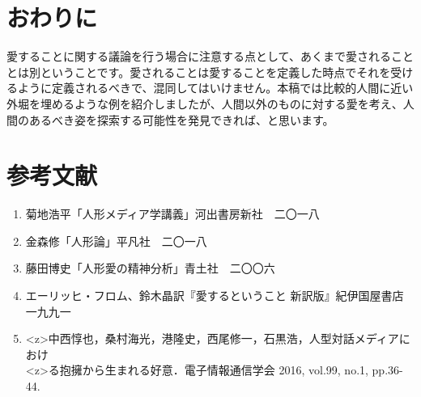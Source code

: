 \documentclass[b5j,twoside,twocolumn]{utarticle}
\begin{document}
\section{おわりに}
愛することに関する議論を行う場合に注意する点として、あくまで愛されることとは別ということです。愛されることは愛することを定義した時点でそれを受けるように定義されるべきで、混同してはいけません。本稿では比較的人間に近い外堀を埋めるような例を紹介しましたが、人間以外のものに対する愛を考え、人間のあるべき姿を探索する可能性を発見できれば、と思います。



\section*{参考文献}
{\small
\begin{enumerate}
\renewcommand{\labelenumi}{\pbox<y>{[\arabic{enumi}]}}
\item 菊地浩平「人形メディア学講義」河出書房新社　二〇一八
\item 金森修「人形論」平凡社　二〇一八
\item 藤田博史「人形愛の精神分析」青土社　二〇〇六
\item エーリッヒ・フロム、鈴木晶訳『愛するということ 新訳版』紀伊国屋書店　一九九一
\item \pbox<z>{中西惇也，桑村海光，港隆史，西尾修一，石黒浩，人型対話メディアにおけ}\\ \pbox<z>{る抱擁から生まれる好意．電子情報通信学会 2016, vol.99, no.1, pp.36-44.}
\end{enumerate}
}
\end{document}
